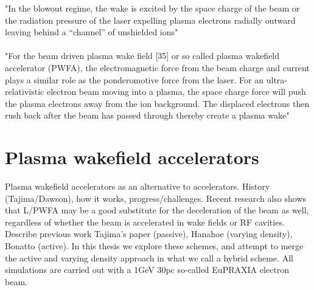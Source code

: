 \clearpage
"In the blowout regime, the wake is excited by the space charge of the beam or the radiation pressure of the laser expelling plasma electrons radially outward leaving behind a “channel” of unshielded ions"\\
\\
"For the beam driven plasma wake field [35] or so called plasma wakefield accelerator (PWFA), the electromagnetic force from the beam charge and current plays a similar role as the ponderomotive force from the laser. For an ultra- relativistic electron beam moving into a plasma, the space charge force will push the plasma electrons away from the ion background. The displaced electrons then rush back after the beam has passed through thereby create a plasma wake"\\
\section{Plasma wakefield accelerators }
Plasma wakefield accelerators as an alternative to accelerators. History (Tajima/Dawson), how it works, progress/challenges. Recent research also shows that L/PWFA may be a good substitute for the deceleration of the beam as well, regardless of whether the beam is accelerated in wake fields or RF cavities. Describe previous work Tajima's paper (passive), Hanahoe (varying density), Bonatto (active). In this thesis we explore these schemes, and attempt to merge the active and varying density approach in what we call a hybrid scheme. All simulations are carried out with a 1GeV 30pc so-called EuPRAXIA electron beam. 
